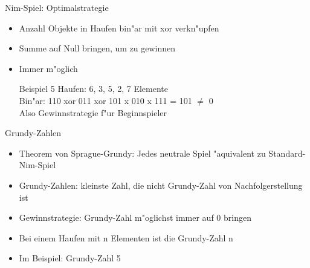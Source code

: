 \documentclass[18pt]{beamer}
\begin{document}
\begin{frame}{Nim-Spiel: Optimalstrategie}
\begin{itemize}
\item Anzahl Objekte in Haufen bin"ar mit xor verkn"upfen
\item Summe auf Null bringen, um zu gewinnen
\item Immer m"oglich
\begin{block}{Beispiel}
5 Haufen: 6, 3, 5, 2, 7 Elemente \\
Bin"ar: 110 xor 011 xor 101 x 010 x 111 = 101 $\neq$ 0  \\
Also Gewinnstrategie f"ur Beginnspieler
\end{block}
\end{itemize}
\end{frame}

\begin{frame}{Grundy-Zahlen}
\begin{itemize}
\item Theorem von Sprague-Grundy: Jedes neutrale Spiel "aquivalent zu Standard-Nim-Spiel
\item Grundy-Zahlen: kleinste Zahl, die nicht Grundy-Zahl von Nachfolgerstellung ist
\item Gewinnstrategie: Grundy-Zahl m"oglichst immer auf 0 bringen
\pause
\item Bei einem Haufen mit n Elementen ist die Grundy-Zahl n
\item Im Beispiel: Grundy-Zahl 5
\end{itemize}
\end{frame}
\end{document}
